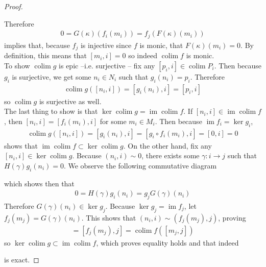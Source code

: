 \documentclass{article}
\DeclareMathOperator{\im}{im}
\DeclareMathOperator{\colim}{colim}
\begin{document}
\begin{proof}
\begin{center}
\end{center}
Therefore 
\begin{align*}
    0=G(\kappa)(f_i(m_i))=f_j(F(\kappa)(m_i)) 
\end{align*}
implies that, because $f_j$ is injective since $f$ is monic, that $F(\kappa)(m_i)=0$. By definition, this means that $[m_i,i]=0$ so indeed $\colim f$ is monic.\\
To show $\colim g$ is epic --i.e. surjective -- fix any $[p_i,i]\in \colim P_i$. Then because $g_i$ is surjective, we get some $n_i\in N_i$ such that $g_i(n_i)=p_i$. Therefore
\begin{align*}
    \colim g([n_i,i])=[g_i(n_i),i]=[p_i,i]
\end{align*}
so $\colim g$ is surjective as well.\\
The last thing to show is that $\ker \colim g=\im \colim f$. If $[n_i,i]\in \im \colim f$, then $[n_i,i]=[f_i(m_i),i]$ for some $m_i\in M_i$. Then because $\im f_i=\ker g_i$,
\begin{align*}
    \colim g([n_i,i])=[g_i(n_i),i]=[g_i\circ f_i(m_i),i]=[0,i]=0
\end{align*}
shows that $\im \colim f \subset \ker \colim g$. On the other hand, fix any $[n_i,i]\in \ker \colim g$. Because $(n_i,i)\sim 0$, there exists some $\gamma:i\to j$ such that $H(\gamma) g_i(n_i)=0$. We observe the following commutative diagram
\begin{center}
\end{center}
which shows then that
\begin{align*}
    0=H(\gamma)g_i(n_i)=g_j G(\gamma)(n_i)
\end{align*}
Therefore $G(\gamma)(n_i)\in \ker g_j$. Because $\ker g_j=\im f_j$, let $f_j(m_j)=G(\gamma)(n_i)$. This shows that $(n_i,i)\sim (f_j(m_j),j)$, proving
\begin{align*}
    [n_i,i]=[f_j(m_j),j]=\colim f([m_j,j])
\end{align*}
so $\ker \colim g\subset \im \colim f$, which proves equality holds and that indeed
\begin{center}
\end{center}
is exact.
\end{proof}
\end{document}
